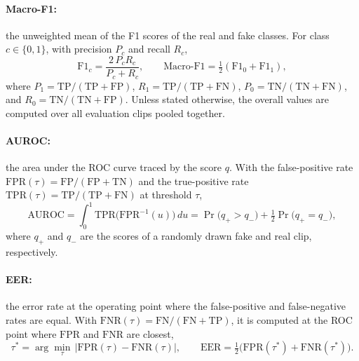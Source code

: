 \documentclass[12pt,a4paper]{report}
\begin{document}
\paragraph{Macro-F1:} the unweighted mean of the F1 scores of the real and fake classes. For class $c \in \{0,1\}$, with precision $P_c$ and recall $R_c$,
\begin{equation}
\mathrm{F1}_c = \frac{2\,P_c R_c}{P_c + R_c}, \qquad
\mathrm{Macro\text{-}F1} = \tfrac{1}{2}\left(\mathrm{F1}_0 + \mathrm{F1}_1\right),
\label{eq:macrof1}
\end{equation}
where $P_1 = \mathrm{TP}/(\mathrm{TP}+\mathrm{FP})$, $R_1 = \mathrm{TP}/(\mathrm{TP}+\mathrm{FN})$, $P_0 = \mathrm{TN}/(\mathrm{TN}+\mathrm{FN})$, and $R_0 = \mathrm{TN}/(\mathrm{TN}+\mathrm{FP})$. Unless stated otherwise, the overall values are computed over all evaluation clips pooled together.

\paragraph{AUROC:} the area under the ROC curve traced by the score $q$. With the false-positive rate $\mathrm{FPR}(\tau) = \mathrm{FP}/(\mathrm{FP}+\mathrm{TN})$ and the true-positive rate $\mathrm{TPR}(\tau) = \mathrm{TP}/(\mathrm{TP}+\mathrm{FN})$ at threshold $\tau$,
\begin{equation}
\mathrm{AUROC} = \int_{0}^{1} \mathrm{TPR}\big(\mathrm{FPR}^{-1}(u)\big)\,du
= \Pr\big(q_{+} > q_{-}\big) + \tfrac{1}{2}\Pr\big(q_{+} = q_{-}\big),
\label{eq:auroc}
\end{equation}
where $q_{+}$ and $q_{-}$ are the scores of a randomly drawn fake and real clip, respectively.

\paragraph{EER:} the error rate at the operating point where the false-positive and false-negative rates are equal. With $\mathrm{FNR}(\tau) = \mathrm{FN}/(\mathrm{FN}+\mathrm{TP})$, it is computed at the ROC point where $\mathrm{FPR}$ and $\mathrm{FNR}$ are closest,
\begin{equation}
\tau^{\ast} = \arg\min_{\tau}\,\big|\mathrm{FPR}(\tau) - \mathrm{FNR}(\tau)\big|, \qquad
\mathrm{EER} = \tfrac{1}{2}\big(\mathrm{FPR}(\tau^{\ast}) + \mathrm{FNR}(\tau^{\ast})\big).
\label{eq:eer}
\end{equation}
\end{document}
